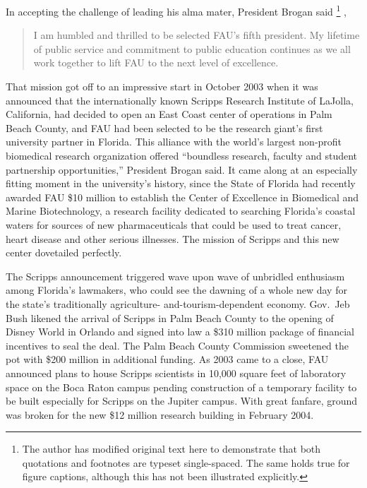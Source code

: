 \documentclass[phd, 12pt, print]{fauthesis}
\begin{document}
In accepting the challenge of leading his alma mater, President Brogan said\relax
%
\footnote{The author has modified original text here to demonstrate that both quotations and footnotes are typeset single-spaced.  The same holds true for figure captions, although this has not been illustrated explicitly.}\relax
%
,
%
\begin{quotation}
I am humbled and thrilled to be selected FAU's fifth president. My lifetime of public service and commitment to public education continues as we all work together to lift FAU to the next level of excellence.
\end{quotation}
%
That mission got off to an impressive start in October 2003 when it was announced that the internationally known Scripps Research Institute of LaJolla, California, had decided to open an East Coast center of operations in Palm Beach County, and FAU had been selected to be the research giant's first university partner in Florida.  This alliance with the world's largest non-profit biomedical research organization offered ``boundless research, faculty and student partnership opportunities,'' President Brogan said.  It came along at an especially fitting moment in the university's history, since the State of Florida had recently awarded FAU \$10 million to establish the Center of Excellence in Biomedical and Marine Biotechnology, a research facility dedicated to searching Florida's coastal waters for sources of new pharmaceuticals that could be used to treat cancer, heart disease and other serious illnesses. The mission of Scripps and this new center dovetailed perfectly.

The Scripps announcement triggered wave upon wave of unbridled enthusiasm among Florida's lawmakers, who could see the dawning of a whole new day for the state's traditionally agriculture- and-tourism-dependent economy.  Gov.\ Jeb Bush likened the arrival of Scripps in Palm Beach County to the opening of Disney World in Orlando and signed into law a \$310 million package of financial incentives to seal the deal.  The Palm Beach County Commission sweetened the pot with \$200 million in additional funding.  As 2003 came to a close, FAU announced plans to house Scripps scientists in 10,000 square feet of laboratory space on the Boca Raton campus pending construction of a temporary facility to be built especially for Scripps on the Jupiter campus.  With great fanfare, ground was broken for the new \$12 million research building in February 2004.
\end{document}
